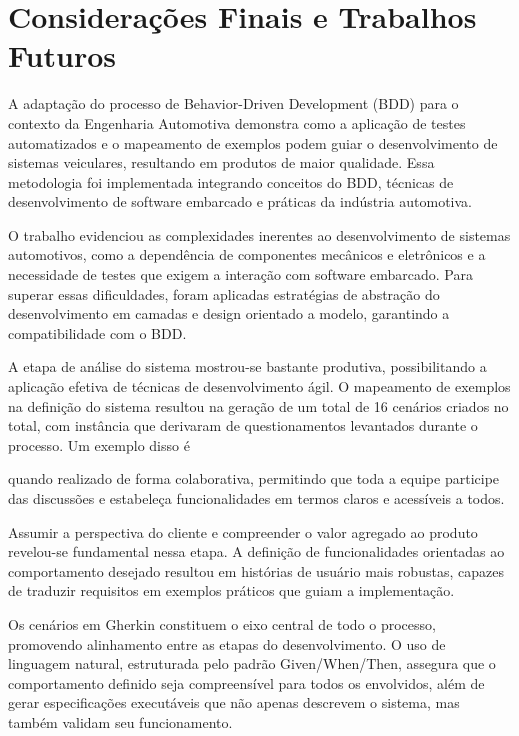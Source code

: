 \chapter{Considerações Finais e Trabalhos Futuros}
 
A adaptação do processo de Behavior-Driven Development (BDD) para o contexto da Engenharia Automotiva demonstra como a aplicação de testes automatizados e o 
mapeamento de exemplos podem guiar o desenvolvimento de sistemas veiculares, resultando em produtos de maior qualidade. Essa metodologia foi implementada integrando 
conceitos do BDD, técnicas de desenvolvimento de software embarcado e práticas da indústria automotiva.

O trabalho evidenciou as complexidades inerentes ao desenvolvimento de sistemas automotivos, como a dependência de componentes mecânicos e eletrônicos e a necessidade 
de testes que exigem a interação com software embarcado. Para superar essas dificuldades, foram aplicadas estratégias de abstração do desenvolvimento em camadas 
e design orientado a modelo, garantindo a compatibilidade com o BDD.

A etapa de análise do sistema mostrou-se bastante produtiva, possibilitando a aplicação efetiva de técnicas de desenvolvimento ágil. O mapeamento de exemplos 
na definição do sistema resultou na geração de um total de 16 cenários criados no total, com instância que derivaram de questionamentos levantados durante o 
processo. Um exemplo disso é 

quando realizado de forma colaborativa, permitindo que toda a equipe participe das discussões e 
estabeleça funcionalidades em termos claros e acessíveis a todos.

Assumir a perspectiva do cliente e compreender o valor agregado ao produto revelou-se fundamental nessa etapa. A definição de funcionalidades orientadas ao 
comportamento desejado resultou em histórias de usuário mais robustas, capazes de traduzir requisitos em exemplos práticos que guiam a implementação.

Os cenários em Gherkin constituem o eixo central de todo o processo, promovendo alinhamento entre as etapas do desenvolvimento. O uso de linguagem natural, estruturada 
pelo padrão Given/When/Then, assegura que o comportamento definido seja compreensível para todos os envolvidos, além de gerar especificações executáveis que não 
apenas descrevem o sistema, mas também validam seu funcionamento.

